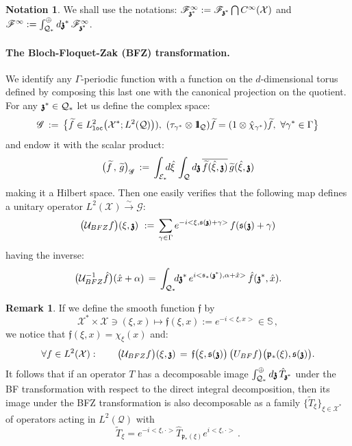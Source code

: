 \documentclass[12pt]{article}
\theoremstyle{definition}
\newtheorem{remark}[theorem]{Remark}
\newtheorem{notation}[theorem]{Notation}
\def\X{\mathcal X}
\def\U{\mathcal{U}}
\def\E{\mathcal E}
\def\T{\mathcal{Q}}
\def\bb1{{\rm{1}\hspace{-3pt}\mathbf{l}}}
\def\p{\mathfrak{p}}
\def\s{\mathfrak{s}}
\def\bz{\mathfrak{z}\hspace*{-4pt}\mathfrak{z}}
\def\beq{\begin{equation}}
\def\eeq{\end{equation}}
\def\tf{\widetilde{f}}
\def\tg{\widetilde{g}}
\numberwithin{equation}{section}
\begin{document}
\begin{notation}
	We shall use the notations: $\mathscr{F}_{\bz^*}^\infty:=\mathscr{F}_{\bz^*}\bigcap{C}^\infty(\X)$ and $\mathscr{F}^\infty:=\int_{\T_*}^{\oplus}d\bz^*\,\mathscr{F}^\infty_{\bz^*}$.
\end{notation}

\paragraph{The Bloch-Floquet-Zak (BFZ) transformation.}

We identify any $\Gamma$-periodic function with a function on the $d$-dimensional torus defined by composing this last one with the canonical projection on the quotient.
 For any $\bz^*\in\T_*$ let us define the complex space:
\beq\label{D-BFZ-Gsp}
\mathscr{G}\,:=\,\big\{\tf\in{L}^2_{\text{\tt loc}}\big(\X^*;L^2(\T)\big)),\ (\tau_{\gamma^*}\otimes\bb1_{\T})\tf=(1\otimes\hat{\chi}_{\gamma^*})\tf,\ \forall\gamma^*\in\Gamma\big\}
\eeq
and endow it with the scalar product:
\beq\label{DF-psc-G}
\big(\tf\,,\,\tg\big)_{\mathscr{G}}\,:=\,\int_{\E_*}\hspace*{-4pt}d\hat{\xi}\,\int_{\T}d\bz\,\overline{\tf(\hat{\xi},\bz)}\,\tg(\hat{\xi},\bz)
\eeq
making it a Hilbert space.
Then one easily verifies that the following map defines a unitary operator $L^2(\X)\overset{\sim}{\rightarrow}\mathscr{G}$:
\beq\label{DF-BFZ-trsf}
\big(\U_{BFZ}f\big)(\xi,\bz)\ :=\,\underset{\gamma\in\Gamma}{\sum}\,e^{-i<\xi,\s(\bz)+\gamma>}\,f(\s(\bz)+\gamma)
\eeq
having the inverse:
\beq
\big(\U_{BFZ}^{-1}\hat{f}\big)(\hat{x}+\alpha)\,=\,\int_{\T_*}\hspace*{-4pt}d\bz^*\,e^{i<\s_*(\bz^*),\alpha+\hat{x}>}\,\hat{f}(\bz^*,\hat{x}).
\eeq

\begin{remark}\label{R-BF-BFZ}
If we define the smooth function $\mathfrak f$ by
\beq\label{eq:2.17} \X^*\times\X\ni(\xi,x)\mapsto\mathfrak{f}(\xi,x):={e}^{-i<\xi,x>}\in\mathbb{S}\,,\eeq
 we notice that $\mathfrak{f}(\xi,x)=\chi_{\xi}(x)$ and:
\beq\label{eq:2.18}
\forall{f}\in{L}^2(\X):\qquad\big(\U_{BFZ}f\big)(\xi,\bz)\,=\,\mathfrak{f}\big(\xi,\s(\bz)\big)\,\big(\mathfrak\U_{BF}f\big)\big(\p_*(\xi),\s(\bz)\big).
\eeq
It follows that if an operator $T$ has a decomposable image $\int_{\T_*}^{\oplus}d\bz\,\hat{T}_{\bz^*}$ under the BF transformation with respect to the direct integral decomposition, then its image under the BFZ transformation is also decomposable as a family $\{\widetilde{T}_{\xi}\}_{\xi\in\X^*}$ of operators acting in $L^2(\T)$ with 
$$\widetilde{T}_{\xi}=e^{-i<\xi,\cdot>}\hat{T}_{\p_*(\xi)}e^{i<\xi,\cdot>}\,.$$
\end{remark}
\end{document}
